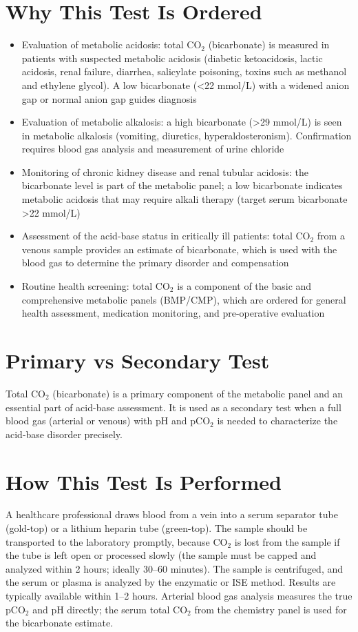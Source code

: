 \section*{Why This Test Is Ordered}
\begin{itemize}
  \item Evaluation of metabolic acidosis: total CO$_2$ (bicarbonate) is measured in patients with suspected metabolic acidosis (diabetic ketoacidosis, lactic acidosis, renal failure, diarrhea, salicylate poisoning, toxins such as methanol and ethylene glycol). A low bicarbonate (<22 mmol/L) with a widened anion gap or normal anion gap guides diagnosis
  \item Evaluation of metabolic alkalosis: a high bicarbonate (>29 mmol/L) is seen in metabolic alkalosis (vomiting, diuretics, hyperaldosteronism). Confirmation requires blood gas analysis and measurement of urine chloride
  \item Monitoring of chronic kidney disease and renal tubular acidosis: the bicarbonate level is part of the metabolic panel; a low bicarbonate indicates metabolic acidosis that may require alkali therapy (target serum bicarbonate >22 mmol/L)
  \item Assessment of the acid-base status in critically ill patients: total CO$_2$ from a venous sample provides an estimate of bicarbonate, which is used with the blood gas to determine the primary disorder and compensation
  \item Routine health screening: total CO$_2$ is a component of the basic and comprehensive metabolic panels (BMP/CMP), which are ordered for general health assessment, medication monitoring, and pre-operative evaluation
\end{itemize}

\section*{Primary vs Secondary Test}
Total CO$_2$ (bicarbonate) is a primary component of the metabolic panel and an essential part of acid-base assessment. It is used as a secondary test when a full blood gas (arterial or venous) with pH and pCO$_2$ is needed to characterize the acid-base disorder precisely.

\section*{How This Test Is Performed}
A healthcare professional draws blood from a vein into a serum separator tube (gold-top) or a lithium heparin tube (green-top). The sample should be transported to the laboratory promptly, because CO$_2$ is lost from the sample if the tube is left open or processed slowly (the sample must be capped and analyzed within 2 hours; ideally 30--60 minutes). The sample is centrifuged, and the serum or plasma is analyzed by the enzymatic or ISE method. Results are typically available within 1--2 hours. Arterial blood gas analysis measures the true pCO$_2$ and pH directly; the serum total CO$_2$ from the chemistry panel is used for the bicarbonate estimate.

